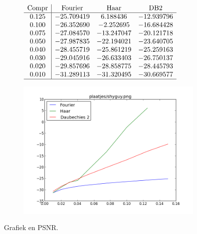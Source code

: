 \begin{figure}
  \centering
  \begin{subfigure}[t]{0.48\textwidth}
    \centering
    \vspace{10pt}
    \begingroup

    \renewcommand*{\arraystretch}{1.5}
    $\begin{array}{c | c c c c}
      \text{Compr} & \text{Fourier} & \text{Haar} & \text{DB2} \\ \hline
      0.125 & -25.709419 & 6.188436 & -12.939796 \\
      0.100 & -26.352690 & -2.252695 & -16.684428 \\
      0.075 & -27.084570 & -13.247047 & -20.121718 \\
      0.050 & -27.987835 & -22.194021 & -23.640705 \\
      0.040 & -28.455719 & -25.861219 & -25.259163 \\
      0.030 & -29.045916 & -26.633403 & -26.750137 \\
      0.020 & -29.857696 & -28.858775 & -28.445793 \\
      0.010 & -31.289113 & -31.320495 & -30.669577 \\ \hline
    \end{array}$
    \endgroup
  \end{subfigure}
  \begin{subfigure}[t]{0.48\textwidth}
    \centering
    \vspace{0pt}
    \includegraphics[height=\textwidth]{plaatjes/grafiek_shyguy_0_15-0_01.png}
  \end{subfigure}
  \caption{Grafiek en PSNR.}
\end{figure}
\restoregeometry
\pagebreak

